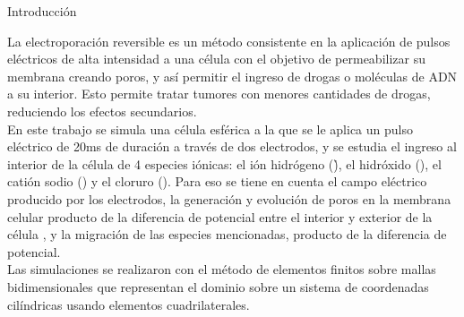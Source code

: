 \documentclass[a0,portrait]{a0poster}
\begin{document}
\vspace{1cm} %


\begin{multicols}{2} %

\color{Navy} %

\begin{center}Introducción\end{center}
La electroporación reversible es un método consistente en la aplicación de pulsos eléctricos de alta intensidad a una célula con el objetivo de permeabilizar su membrana creando poros, y así permitir el ingreso de drogas o moléculas de ADN a su interior. Esto permite tratar tumores con menores cantidades de drogas, reduciendo los efectos secundarios.\\

En este trabajo se simula una célula esférica a la que se le aplica un pulso eléctrico de 20\si{\milli\second} de duración a través de dos electrodos, y se estudia el ingreso al interior de la célula de 4 especies iónicas: el ión hidrógeno (\h), el hidróxido (\oh), el catión sodio (\na) y el cloruro (\cl). Para eso se tiene en cuenta el campo eléctrico producido por los electrodos, la generación y evolución de poros en la membrana celular producto de la diferencia de potencial entre el interior y exterior de la célula , y la migración de las especies mencionadas, producto de la diferencia de potencial.\\

Las simulaciones se realizaron con el método de elementos finitos sobre mallas bidimensionales que representan el dominio sobre un sistema de coordenadas cilíndricas usando elementos cuadrilaterales.




\end{multicols}
\end{document}

